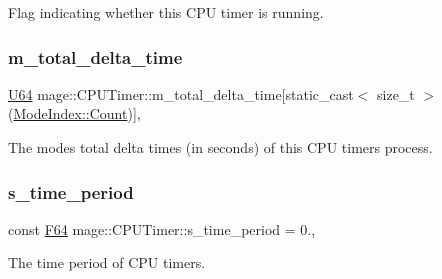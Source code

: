 Flag indicating whether this C\+PU timer is running. \hypertarget{classmage_1_1_c_p_u_timer_a1c6d043eb08b1689d0f52dbd886fa9d4}{}\label{classmage_1_1_c_p_u_timer_a1c6d043eb08b1689d0f52dbd886fa9d4} 
\subsubsection{\texorpdfstring{m\+\_\+total\+\_\+delta\+\_\+time}{m\_total\_delta\_time}}
{\footnotesize\ttfamily \hyperlink{namespacemage_a6672cf3c861707ce4a3235a3eb43941d}{U64} mage\+::\+C\+P\+U\+Timer\+::m\+\_\+total\+\_\+delta\+\_\+time\mbox{[}static\+\_\+cast$<$ size\+\_\+t $>$(\hyperlink{classmage_1_1_c_p_u_timer_a98d59db3c396b14269c937e016c7625eae93f994f01c537c4e2f7d8528c3eb5e9}{Mode\+Index\+::\+Count})\mbox{]}\hspace{0.3cm}{\ttfamily [mutable]}, {\ttfamily [private]}}

The modes\textquotesingle{} total delta times (in seconds) of this C\+PU timer\textquotesingle{}s process. \hypertarget{classmage_1_1_c_p_u_timer_acc0608b5b5d211b09486244e43fcfb87}{}\label{classmage_1_1_c_p_u_timer_acc0608b5b5d211b09486244e43fcfb87} 
\subsubsection{\texorpdfstring{s\+\_\+time\+\_\+period}{s\_time\_period}}
{\footnotesize\ttfamily const \hyperlink{namespacemage_ad26233bbec640deda836e572c1a23708}{F64} mage\+::\+C\+P\+U\+Timer\+::s\+\_\+time\+\_\+period = 0.\hspace{0.3cm}{\ttfamily [static]}, {\ttfamily [private]}}

The time period of C\+PU timers. 